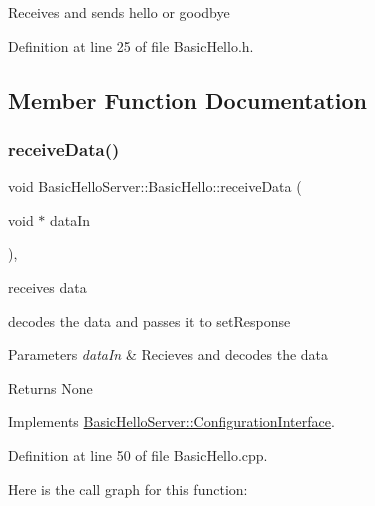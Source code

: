 Receives and sends hello or goodbye 

Definition at line 25 of file Basic\+Hello.\+h.



\subsection{Member Function Documentation}
\mbox{\label{classBasicHelloServer_1_1BasicHello_a51e08649c1783b6e86ef4d329c85dcad}} 
\subsubsection{\texorpdfstring{receiveData()}{receiveData()}}
{\footnotesize\ttfamily void Basic\+Hello\+Server\+::\+Basic\+Hello\+::receive\+Data (\begin{DoxyParamCaption}\item[{void $\ast$}]{data\+In }\end{DoxyParamCaption})\hspace{0.3cm}{\ttfamily [override]}, {\ttfamily [virtual]}}



receives data 

decodes the data and passes it to set\+Response


\begin{DoxyParams}{Parameters}
{\em data\+In} & Recieves and decodes the data\\
\hline
\end{DoxyParams}
\begin{DoxyReturn}{Returns}
None 
\end{DoxyReturn}


Implements \mbox{\hyperlink{classBasicHelloServer_1_1ConfigurationInterface_ac78a0a5d2a619073b272ca216ff14f14}{Basic\+Hello\+Server\+::\+Configuration\+Interface}}.



Definition at line 50 of file Basic\+Hello.\+cpp.

Here is the call graph for this function\+:
\mbox{\label{classBasicHelloServer_1_1BasicHello_aec194431ec40a83e40c09b42b3c31065}} 

